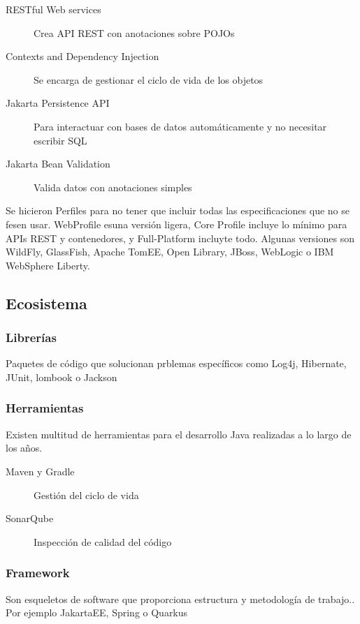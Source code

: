     \begin{description}
        \item[RESTful Web services] Crea API REST con anotaciones sobre POJOs
        \item[Contexts and Dependency Injection] Se encarga de gestionar el ciclo de vida de los objetos
        \item[Jakarta Persistence API] Para interactuar con bases de datos automáticamente y no necesitar escribir SQL
        \item[Jakarta Bean Validation] Valida datos con anotaciones simples
    \end{description}

    Se hicieron Perfiles para no tener que incluir todas las especificaciones que no se fesen  usar. WebProfile esuna versión ligera, Core Profile incluye lo mínimo para APIs REST y contenedores, y Full-Platform incluyte todo. Algunas versiones son WildFly, GlassFish, Apache TomEE, Open Library, JBoss, WebLogic o IBM WebSphere Liberty.


\subsection{Ecosistema}

    \subsubsection{Librerías}
        Paquetes de código que solucionan prblemas específicos como Log4j, Hibernate, JUnit, lombook o Jackson

    \subsubsection{Herramientas}
        Existen multitud de herramientas para el desarrollo Java realizadas a lo largo de los años.
        \begin{description}
            \item[Maven y Gradle] Gestión del ciclo de vida
            \item[SonarQube] Inspección de calidad del código
        \end{description}

    \subsubsection{Framework}
        Son esqueletos de software que proporciona estructura y metodología de trabajo.. Por ejemplo JakartaEE, Spring o Quarkus

